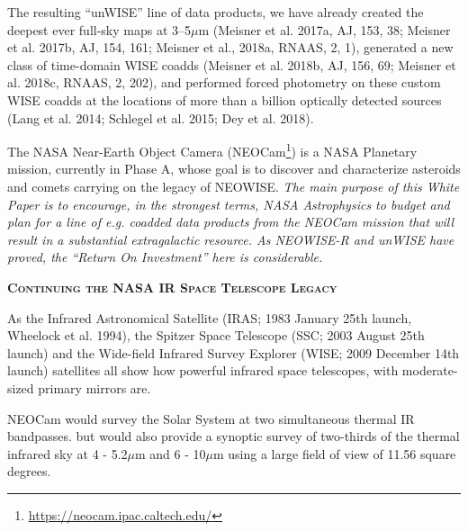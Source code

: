 \documentclass[12pt]{article}
\begin{document}
\smallskip
\noindent
The resulting ``unWISE'' line of data products, we have already created the deepest ever full-sky maps at 3–5$\mu$m 
(Meisner et al. 2017a, AJ, 153, 38;  
Meisner et al. 2017b, AJ, 154, 161; 
Meisner et al., 2018a, RNAAS, 2, 1), 
generated a new class of time-domain WISE coadds 
(Meisner et al.  2018b, AJ, 156, 69; 
Meisner et al.  2018c, RNAAS, 2, 202), and performed forced photometry on these custom WISE coadds at the locations of more than a billion optically detected sources
 (Lang et al. 2014; Schlegel et al. 2015; Dey et al. 2018).

\smallskip
\noindent
The NASA Near-Earth Object Camera (NEOCam\footnote{\href{https://neocam.ipac.caltech.edu/}{https://neocam.ipac.caltech.edu/}}) is a NASA Planetary mission, currently in Phase A, whose goal is to discover and characterize asteroids and comets carrying on the legacy of NEOWISE.
%
{\it The main purpose of this White Paper is to encourage, in the strongest terms, NASA Astrophysics to 
budget and plan for a line of e.g. coadded data products from the NEOCam mission that will result in a substantial extragalactic resource. As NEOWISE-R and unWISE have proved, the ``Return On Investment'' here is considerable.}


\smallskip
\smallskip
\noindent
{\bfseries \textsc{\textcolor{Cerulean}{Continuing the NASA IR Space Telescope Legacy}}} 

\smallskip
\noindent
As the Infrared Astronomical Satellite (IRAS; 1983 January 25th launch, Wheelock et al. 1994), 
the Spitzer Space Telescope (SSC; 2003 August 25th launch) and the Wide-field
Infrared Survey Explorer (WISE; 2009 December 14th launch) satellites all show 
how powerful infrared space telescopes, with moderate-sized primary mirrors are.

\smallskip
\smallskip
\noindent
NEOCam would survey the Solar System at two simultaneous thermal IR bandpasses. 
but would also provide a synoptic survey of two-thirds of the thermal infrared sky at 4 - 5.2$\mu$m and  6 - 10$\mu$m using a large field of view of 11.56 square degrees. 
\end{document}
